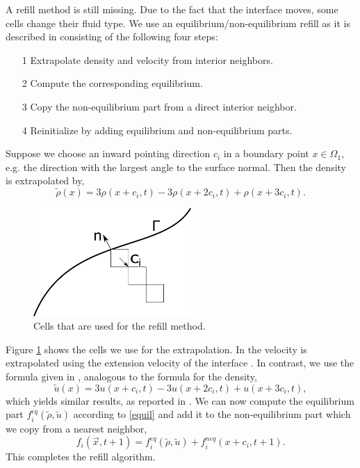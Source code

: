 \documentclass[final,leqno,onefignum,onetabnum]{siamltexmm}
\begin{document}
A refill method is still missing. Due to the fact that the interface moves, some cells change their fluid type. We use an equilibrium/non-equilibrium refill as it is described in \cite{Caiazzo} consisting of the following four steps:
\begin{itemize}
	\item[1] Extrapolate density and velocity from interior neighbors.
	\item[2] Compute the corresponding equilibrium.
	\item[3] Copy the non-equilibrium part from a direct interior neighbor.
	\item[4] Reinitialize by adding equilibrium and non-equilibrium parts.
\end{itemize}
Suppose we choose an inward pointing direction $c_i$ in a boundary point $x \in \Omega_1$, e.g. the direction with the largest angle to the surface normal. Then the density is extrapolated by,
\begin{equation}
  \tilde{\rho}(x) = 3\rho(x+c_i,t) - 3\rho(x+2c_i,t) + \rho(x+3c_i,t).
\end{equation}
\begin{figure}
	\hfill\includegraphics[width=6cm,natwidth=445,natheight=305]{refillmethod.png}\hspace*{\fill}
	\caption{Cells that are used for the refill method.}
	\label{refill}
\end{figure}
Figure \ref{refill} shows the cells we use for the extrapolation. In \cite{Thoemmes} the velocity is extrapolated using the extension velocity of the interface \cite{Adalsteinsson}. In contrast, we use the formula given in \cite{Lallemand}, analogous to the formula for the density,
\begin{equation}
  \tilde{u}(x) = 3u(x+c_i,t) - 3u(x+2c_i,t) + u(x+3c_i,t),
\end{equation}
which yields similar results, as reported in \cite{Lallemand}.
We can now compute the equilibrium part $f_i^{eq}(\tilde{\rho},\tilde{u})$ according to \cref{equil} and add it to the non-equilibrium part which we copy from a nearest neighbor,
$$f_i(\vec{x},t+1) = f_i^{eq}(\tilde{\rho},\tilde{u}) + f_i^{neq}(x+c_i,t+1) \text{.}$$
This completes the refill algorithm.
\end{document}
